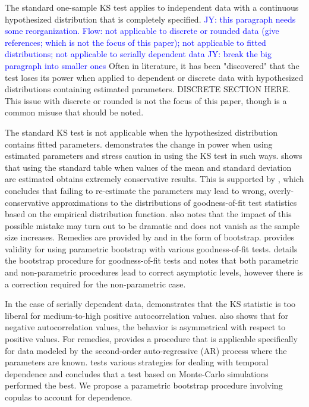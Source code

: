 \documentclass[12pt, letterpaper, titlepage]{article}
\newcommand{\jy}[1]{\textcolor{blue}{JY: #1}}
\begin{document}
The standard one-sample KS test applies to independent data with a continuous
hypothesized distribution that is completely specified.
\jy{this paragraph needs some reorganization.
  Flow: not applicable to discrete or rounded data (give references; which is
  not the focus of this paper);
  not applicable to fitted distributions;
  not applicable to serially dependent data}
\jy{break the big paragraph into smaller ones}
Often in literature, it has been "discovered" that the test loses its power when 
applied to dependent or discrete data with hypothesized distributions containing 
estimated parameters. DISCRETE SECTION HERE. This issue with discrete or rounded
is not the focus of this paper, though is a common misuse that should be 
noted.

The standard KS test is not applicable when the hypothesized distribution 
contains fitted parameters. \citet{Steinskog} demonstrates the change in power 
when using estimated parameters and stress caution in using the KS test in such 
ways. \citet{Lilliefors} shows that using the standard table when values of the 
mean and standard deviation are estimated obtains extremely conservative 
results. This is supported by \citet{Capasso}, which concludes that failing to 
re-estimate the parameters may lead to wrong, overly-conservative approximations 
to the distributions of goodness-of-fit test statistics based on the empirical 
distribution function. \citet{Capasso} also notes that the impact of this 
possible mistake may turn out to be dramatic and does not vanish as the sample 
size increases. Remedies are provided by \citet{Genest} and \citet{Babu} in the 
form of bootstrap. \citet{Genest} provides validity for using parametric 
bootstrap with various goodness-of-fit tests. \citet{Babu} details the bootstrap
procedure for goodness-of-fit tests and notes that both parametric and 
non-parametric procedures lead to correct asymptotic levels, however there 
is a correction required for the non-parametric case. 

In the case of serially dependent data, \citet{Durilleul} demonstrates that the 
KS statistic is too liberal for medium-to-high positive autocorrelation values. 
\citet{Durilleul} also shows that for negative autocorrelation values, the 
behavior is asymmetrical with respect to positive values. For remedies, 
\citet{Weiss} provides a procedure that is applicable specifically for data 
modeled by the second-order auto-regressive (AR) process where the parameters 
are known. \citet{Lanzante} tests various strategies for dealing with temporal 
dependence and concludes that a test based on Monte-Carlo simulations performed 
the best. We propose a parametric bootstrap procedure involving copulas to 
account for dependence.
\end{document}

